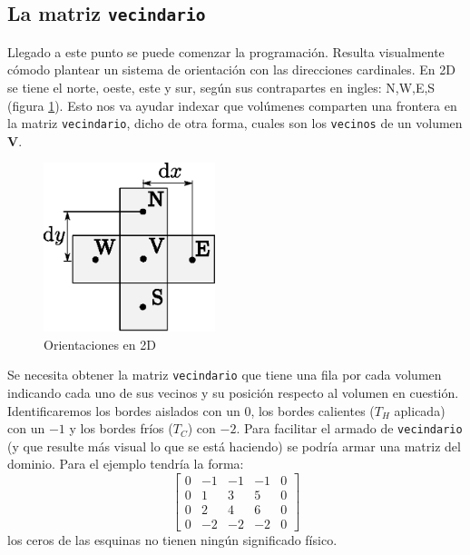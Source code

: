 \documentclass[11pt, titlepage]{article}
\begin{document}
\subsection{La matriz \texttt{vecindario}}
Llegado a este punto se puede comenzar la programación. Resulta visualmente cómodo plantear un sistema de orientación con las direcciones cardinales. En 2D se tiene el norte, oeste, este y sur, según sus contrapartes en ingles: N,W,E,S (figura \ref{fig:nsew}). Esto nos va ayudar indexar que volúmenes comparten una frontera en la matriz \texttt{vecindario}, dicho de otra forma, cuales son los \texttt{vecinos} de un volumen \textbf{V}.

\begin{figure}[htb!]
    \centering
    \includegraphics[width=5cm]{fig/nsew.eps}
    \caption{Orientaciones en 2D}
    \label{fig:nsew}
\end{figure}



Se necesita obtener la matriz \texttt{vecindario} que tiene una fila por cada volumen indicando cada uno de sus vecinos y su posición respecto al volumen en cuestión. Identificaremos los bordes aislados con un $0$, los bordes calientes ($T_H$ aplicada) con un $-1$ y los bordes fríos ($T_C$) con $-2$. Para facilitar el armado de \texttt{vecindario} (y que resulte más visual lo que se está haciendo) se podría armar una matriz del dominio. Para el ejemplo tendría la forma:
\begin{equation*}
    \begin{bmatrix}
    0 &-1 &-1 &-1 & 0 \\
    0 & 1 & 3 & 5 & 0 \\
    0 & 2 & 4 & 6 & 0 \\
    0 & -2 & -2 &-2 &0
    \end{bmatrix}
\end{equation*}
los ceros de las esquinas no tienen ningún significado físico.
\end{document}
